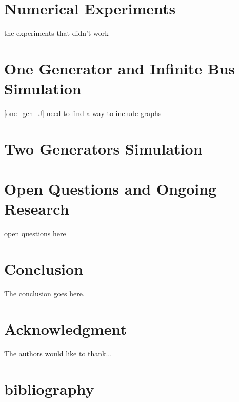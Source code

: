 \documentclass[12pt,English]{article}
\begin{document}
\section{Numerical Experiments}
the experiments that didn't work %
\section{One Generator and Infinite Bus Simulation}
\ref{one_gen_J} need to find a way to include graphs
\section{Two Generators Simulation}
\section{Open Questions and Ongoing Research}
open questions here
\section{Conclusion}
The conclusion goes here.
\section*{Acknowledgment}
The authors would like to thank...
\section*{bibliography}
\end{document}
